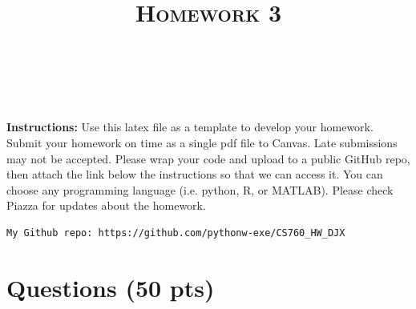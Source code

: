 \documentclass[a4paper]{article}
\title{\textsc{Homework 3}} %
\author{
\red{$>>$Jingxin Du$<<$} \\
\red{$>>$jdu86/9084542332$<<$}\\
}
\date{}
\theoremstyle{definition}
\begin{document}
\maketitle 


\textbf{Instructions:} 
Use this latex file as a template to develop your homework. Submit your homework on time as a single pdf file to Canvas. Late submissions may not be accepted. Please wrap your code and upload to a public GitHub repo, then attach the link below the instructions so that we can access it. You can choose any programming language (i.e. python, R, or MATLAB). Please check Piazza for updates about the homework.
{\color{blue}
\begin{verbatim}
My Github repo: https://github.com/pythonw-exe/CS760_HW_DJX
\end{verbatim}
}
\section{Questions (50 pts)}
\end{document}
